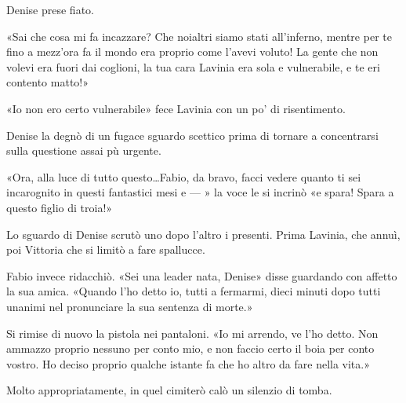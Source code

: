 Denise prese fiato.

«Sai che cosa mi fa incazzare? Che noialtri siamo stati all'inferno, mentre per te fino a mezz'ora fa il mondo era proprio come l'avevi voluto! La gente che non volevi era fuori dai coglioni, la tua cara Lavinia era sola e vulnerabile, e te eri contento matto!»

«Io non ero certo vulnerabile» fece Lavinia con un po' di risentimento.

Denise la degnò di un fugace sguardo scettico prima di tornare a concentrarsi sulla questione assai pù urgente.

«Ora, alla luce di tutto questo\ldots Fabio, da bravo, facci vedere quanto ti sei incarognito in questi fantastici mesi e --- » la voce le si incrinò «e spara! Spara a questo figlio di troia!»

Lo sguardo di Denise scrutò uno dopo l'altro i presenti. Prima Lavinia, che annuì, poi Vittoria che si limitò a fare spallucce.

Fabio invece ridacchiò. «Sei una leader nata, Denise» disse guardando con affetto la sua amica. «Quando l'ho detto io, tutti a fermarmi, dieci minuti dopo tutti unanimi nel pronunciare la sua sentenza di morte.»

Si rimise di nuovo la pistola nei pantaloni. «Io mi arrendo, ve l'ho detto. Non ammazzo proprio nessuno per conto mio, e non faccio certo il boia per conto vostro. Ho deciso proprio qualche istante fa che ho altro da fare nella vita.»

Molto appropriatamente, in quel cimiterò calò un silenzio di tomba.
